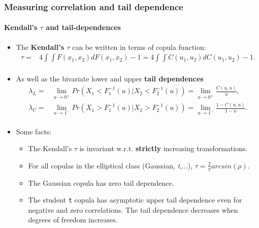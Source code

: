 \documentclass{beamer}
\begin{document}
\begin{frame}
  \frametitle{Measuring correlation and tail dependence}
  \framesubtitle{Kendall's $\tau$ and tail-dependences}
  \begin{itemize}
  \item The \textbf{Kendall's $\tau$} can be written in terms of copula function:
    \begin{equation*}
      \begin{split}
        \tau = & 4 \int \int F(x_1, x_2)dF(x_1,x_2)-1 = 4 \int \int C(u_1, u_2)dC(u_1,u_2)-1. \\
      \end{split}
    \end{equation*}

  \item As well as the bivariate lower and upper \textbf{tail dependences}
    \begin{equation*}
      \begin{split}
        \lambda_L = & \lim \limits_{u \to 0^{+}} Pr(X_1< F_1^{-1}(u)| X_2<F_2^{-1}(u))= \lim \limits_{u \to 0^{+}} \frac{C(u,u)}{u},\\
        \lambda_U=&\lim \limits_{u \to 1^{-}} Pr(X_1> F_1^{-1}(u)|
        X_2>F_2^{-1}(u))= \lim \limits_{u \to 1^{-}} \frac{1-C(u,u)}{1-u}.\\
      \end{split}
    \end{equation*}

  \item Some facts:
    \begin{itemize}
    \item The Kendall's $\tau$ is invariant w.r.t. \textbf{strictly} increasing transformations.
    \item For all copulas in the elliptical class (Gaussian, \emph{t},...),
      $\tau = \frac{2}{\pi}arcsin(\rho)$.
    \item The Gaussian copula has zero tail dependence.
    \item The  student \texttt{t} copula has asymptotic upper tail dependence even for negative
      and zero correlations. The tail dependence decreases when degrees of
      freedom increases.
    \end{itemize}
  \end{itemize}
\end{frame}
\end{document}
